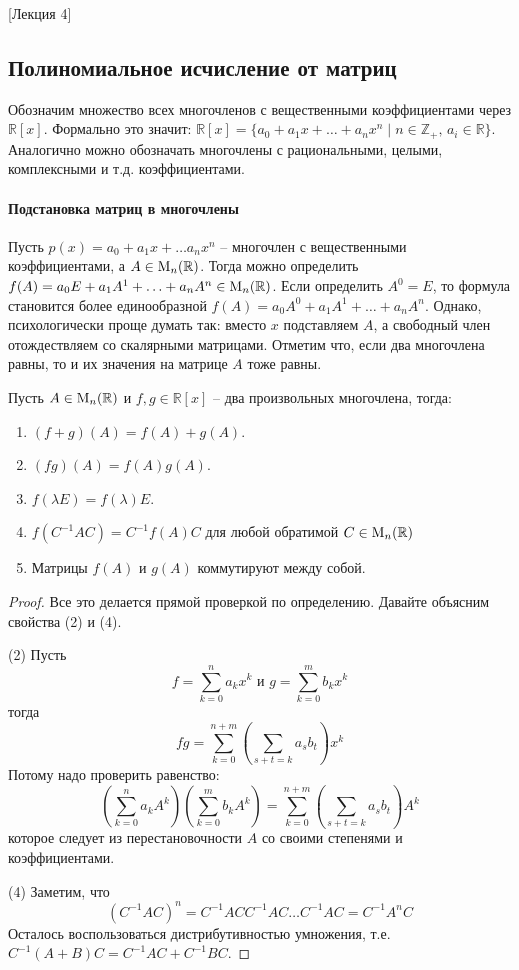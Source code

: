 [Лекция 4]


\subsection{Полиномиальное исчисление от матриц}

Обозначим множество всех многочленов с вещественными коэффициентами через $\mathbb R[x]$. Формально это значит: $\mathbb R[x]=\{a_0+a_1x + \ldots + a_n x^n\mid n\in \mathbb Z_{+},\, a_i\in \mathbb R\}$. Аналогично можно обозначать многочлены с рациональными, целыми, комплексными и т.д. коэффициентами. 


\paragraph{Подстановка матриц в многочлены}

Пусть $p(x) = a_0+a_1x+\ldots a_n x^n$ -- многочлен с вещественными коэффициентами, а $A\in\operatorname{M}_{n}(\mathbb R)$. Тогда можно определить $f(A)= a_0 E + a_1 A^1 + \ldots + a_n A^n\in\operatorname{M}_{n}(\mathbb R)$. Если определить $A^0 = E$, то формула становится более единообразной $f(A)= a_0 A^0 + a_1 A^1 + \ldots + a_n A^n$. Однако, психологически проще думать так: вместо $x$ подставляем $A$, а свободный член отождествляем со скалярными матрицами.  Отметим что, если два многочлена равны, то и их значения на матрице $A$ тоже равны.

\begin{claim*}
Пусть $A\in\operatorname{M}_{n}(\mathbb R)$ и $f,g\in\mathbb R[x]$ -- два произвольных многочлена, тогда:
\begin{enumerate}
\item $(f+g)(A) = f(A) + g(A)$.
\item $(fg)(A) = f(A)g(A)$.
\item $f(\lambda E) = f(\lambda)E$.
\item $f(C^{-1}AC) = C^{-1}f(A)C$ для любой обратимой $C\in \operatorname{M}_{n}(\mathbb R)$
\item Матрицы $f(A)$ и $g(A)$ коммутируют между собой.
\end{enumerate}
\end{claim*}
\begin{proof}
Все это делается прямой проверкой по определению. Давайте объясним свойства (2) и (4).

(2) Пусть 
\[
f = \sum_{k=0}^na_k x^k\text{ и }g = \sum_{k=0}^m b_k x^k
\]
тогда 
\[
fg = \sum_{k=0}^{n + m} \left(\sum_{s + t = k }a_s b_t\right) x^k
\]
Потому надо проверить равенство:
\[
\left(\sum_{k=0}^n a_k A^k\right)\left(\sum_{k=0}^mb_k A^k\right) = \sum_{k=0}^{n+m}\left(\sum_{s+t = k} a_s b_t\right)A^k
\]
которое следует из перестановочности $A$ со своими степенями и коэффициентами.

(4) Заметим, что
\[
(C^{-1}AC)^n = C^{-1}ACC^{-1}AC\ldots C^{-1}AC = C^{-1}A^nC
\]
Осталось воспользоваться дистрибутивностью умножения, т.е. $C^{-1}(A + B)C = C^{-1}AC + C^{-1}BC$.
\end{proof}




